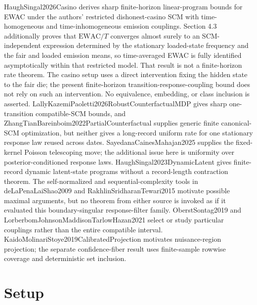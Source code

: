 \documentclass{article}
\begin{document}
HaughSingal2026Casino derives sharp finite-horizon linear-program bounds for EWAC under the authors' restricted dishonest-casino SCM with time-homogeneous and time-inhomogeneous emission couplings. Section 4.3 additionally proves that \(\mathrm{EWAC}/T\) converges almost surely to an SCM-independent expression determined by the stationary loaded-state frequency and the fair and loaded emission means, so time-averaged EWAC is fully identified asymptotically within that restricted model. That result is not a finite-horizon rate theorem. The casino setup uses a direct intervention fixing the hidden state to the fair die; the present finite-horizon transition-response-coupling bound does not rely on such an intervention. No equivalence, embedding, or class inclusion is asserted. LallyKazemiPaoletti2026RobustCounterfactualMDP gives sharp one-transition compatible-SCM bounds, and ZhangTianBareinboim2022PartialCounterfactual supplies generic finite canonical-SCM optimization, but neither gives a long-record uniform rate for one stationary response law reused across dates. SayedanaCainesMahajan2025 supplies the fixed-kernel Poisson telescoping move; the additional issue here is uniformity over posterior-conditioned response laws. HaughSingal2023DynamicLatent gives finite-record dynamic latent-state programs without a record-length contraction theorem. The self-normalized and sequential-complexity tools in deLaPenaLaiShao2009 and RakhlinSridharanTewari2015 motivate possible maximal arguments, but no theorem from either source is invoked as if it evaluated this boundary-singular response-filter family. OberstSontag2019 and LorberbomJohnsonMaddisonTarlowHazan2021 select or study particular couplings rather than the entire compatible interval. KaidoMolinariStoye2019CalibratedProjection motivates nuisance-region projection; the separate confidence-fiber result uses finite-sample rowwise coverage and deterministic set inclusion.

\section{Setup}
\end{document}
